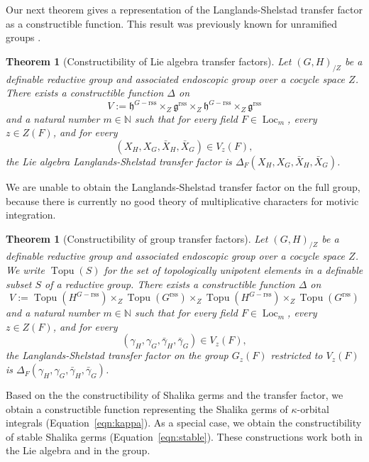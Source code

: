 \documentclass[12pt]{amsart}
\newcommand{\op}[1]{\operatorname{#1}}
\newcommand{\ring}[1]{{\mathbb #1}}
\newcommand{\fg}{\mathfrak{g}}
\newcommand{\fh}{\mathfrak{h}}
\newcommand{\reg}{\mathrm{rss}}
\theoremstyle{plain}
\newtheorem{theorem}[thm]{Theorem}
\theoremstyle{definition}
\begin{document}
Our next theorem gives a representation of the Langlands-Shelstad
transfer factor as a constructible function.  This result was
previously known for unramified groups \cite{CHL}.

\begin{theorem}[Constructibility of Lie algebra transfer
  factors]\label{thm:xfer-factor} 
Let
  $(G,H)_{/Z}$ be a definable reductive group and associated
  endoscopic group over a cocycle space $Z$.  There exists a
  constructible function $\Delta$ on
\begin{equation}\label{eqn:delta-domain}
V := \fh^{G-\reg}\times_Z
  \fg^\reg\times_Z
\fh^{G-\reg}\times_Z
  \fg^\reg
\end{equation}
and a natural number $m\in \ring{N}$ such that for every field $F\in
\op{Loc}_{m}$, every $z\in Z(F)$, and for every 
\[
(X_H,X_G,\bar X_H,\bar X_G)\in
V_z(F),\]  
the Lie algebra Langlands-Shelstad transfer factor is
$\Delta_F(X_H,X_G,\bar X_H,\bar X_G)$.
\end{theorem}

We are unable to obtain the Langlands-Shelstad
transfer factor on the full group, because there is currently no good
theory of multiplicative characters for motivic integration.

\begin{theorem}[Constructibility of group transfer factors] Let
  $(G,H)_{/Z}$ be a definable reductive group and associated
  endoscopic group over a cocycle space $Z$.  We write $\op{Topu}(S)$
  for the set of topologically unipotent elements in a definable
  subset $S$ of a reductive group.  There exists a constructible
  function $\Delta$ on
\[
V := \op{Topu}(H^{G-\reg})\times_Z
  \op{Topu}(G^\reg)\times_Z
\op{Topu}(H^{G-\reg})\times_Z
  \op{Topu}(G^\reg)
\] 
and a natural number $m\in \ring{N}$ such that for every field $F\in
\op{Loc}_{m}$, every $z\in Z(F)$, and for every 
\[
(\gamma_H,\gamma_G,\bar \gamma_H,\bar \gamma_G)\in V_z(F),\] the
Langlands-Shelstad transfer factor on the group $G_z(F)$ restricted to
$V_z(F)$ is $\Delta_F(\gamma_H,\gamma_G,\bar \gamma_H,\bar
\gamma_G)$.
\end{theorem}

Based on the the constructibility of Shalika germs and the transfer
factor, we obtain a constructible function representing the Shalika
germs of $\kappa$-orbital integrals (Equation~\ref{eqn:kappa}).  As a
special case, we obtain the constructibility of stable Shalika germs
(Equation~\ref{eqn:stable}).  These constructions work both in the Lie
algebra and in the group.
\end{document}

